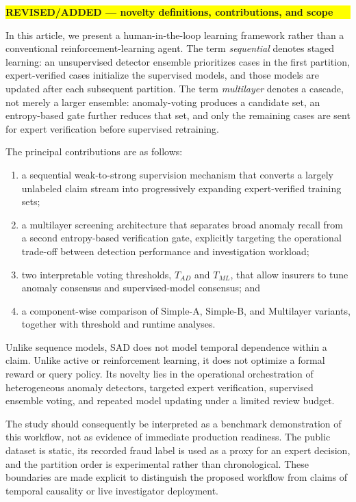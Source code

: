 \documentclass[12pt]{article}
\newcommand{\revmark}[1]{\par\noindent\colorbox{yellow}{%
  \parbox{\dimexpr\linewidth-2\fboxsep}{\raggedright\strut\textbf{#1}}}%
  \par\smallskip}
\begin{document}

\revmark{REVISED/ADDED --- novelty definitions, contributions, and scope}
In this article, we present a human-in-the-loop learning framework rather
than a conventional reinforcement-learning agent. The term
\emph{sequential} denotes staged learning: an unsupervised detector ensemble
prioritizes cases in the first partition, expert-verified cases initialize the
supervised models, and those models are updated after each subsequent
partition. The term \emph{multilayer} denotes a cascade, not merely a larger
ensemble: anomaly-voting produces a candidate set, an entropy-based gate
further reduces that set, and only the remaining cases are sent for expert
verification before supervised retraining.

The principal contributions are as follows:
\begin{enumerate}[label=(\roman*),leftmargin=*]
  \item a sequential weak-to-strong supervision mechanism that converts a
  largely unlabeled claim stream into progressively expanding expert-verified
  training sets;
  \item a multilayer screening architecture that separates broad anomaly
  recall from a second entropy-based verification gate, explicitly targeting
  the operational trade-off between detection performance and investigation
  workload;
  \item two interpretable voting thresholds, $T_{AD}$ and $T_{ML}$, that allow
  insurers to tune anomaly consensus and supervised-model consensus; and
  \item a component-wise comparison of Simple-A, Simple-B, and Multilayer
  variants, together with threshold and runtime analyses.
\end{enumerate}

Unlike sequence models, SAD does not model temporal dependence within a
claim. Unlike active or reinforcement learning, it does not optimize a formal
reward or query policy. Its novelty lies in the operational orchestration of
heterogeneous anomaly detectors, targeted expert verification, supervised
ensemble voting, and repeated model updating under a limited review budget.

The study should consequently be interpreted as a benchmark demonstration of
this workflow, not as evidence of immediate production readiness. The public
dataset is static, its recorded fraud label is used as a proxy for an expert
decision, and the partition order is experimental rather than chronological.
These boundaries are made explicit to distinguish the proposed workflow from
claims of temporal causality or live investigator deployment.
\end{document}
